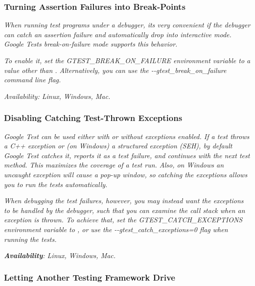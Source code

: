 {\itshape }

{\itshape \subsubsection*{Turning Assertion Failures into Break-\/\+Points}}

{\itshape }

{\itshape When running test programs under a debugger, it\textquotesingle{}s very convenient if the debugger can catch an assertion failure and automatically drop into interactive mode. Google Test\textquotesingle{}s {\itshape break-\/on-\/failure} mode supports this behavior.}

{\itshape To enable it, set the {\ttfamily G\+T\+E\+S\+T\+\_\+\+B\+R\+E\+A\+K\+\_\+\+O\+N\+\_\+\+F\+A\+I\+L\+U\+RE} environment variable to a value other than {} . Alternatively, you can use the {\ttfamily -\/-\/gtest\+\_\+break\+\_\+on\+\_\+failure} command line flag.}

{\itshape {\itshape Availability\+:} Linux, Windows, Mac.}

{\itshape \subsubsection*{Disabling Catching Test-\/\+Thrown Exceptions}}

{\itshape }

{\itshape Google Test can be used either with or without exceptions enabled. If a test throws a C++ exception or (on Windows) a structured exception (S\+EH), by default Google Test catches it, reports it as a test failure, and continues with the next test method. This maximizes the coverage of a test run. Also, on Windows an uncaught exception will cause a pop-\/up window, so catching the exceptions allows you to run the tests automatically.}

{\itshape When debugging the test failures, however, you may instead want the exceptions to be handled by the debugger, such that you can examine the call stack when an exception is thrown. To achieve that, set the {\ttfamily G\+T\+E\+S\+T\+\_\+\+C\+A\+T\+C\+H\+\_\+\+E\+X\+C\+E\+P\+T\+I\+O\+NS} environment variable to {}, or use the {\ttfamily -\/-\/gtest\+\_\+catch\+\_\+exceptions=0} flag when running the tests.}

{\itshape {\bfseries Availability}\+: Linux, Windows, Mac.}

{\itshape \subsubsection*{Letting Another Testing Framework Drive}}


